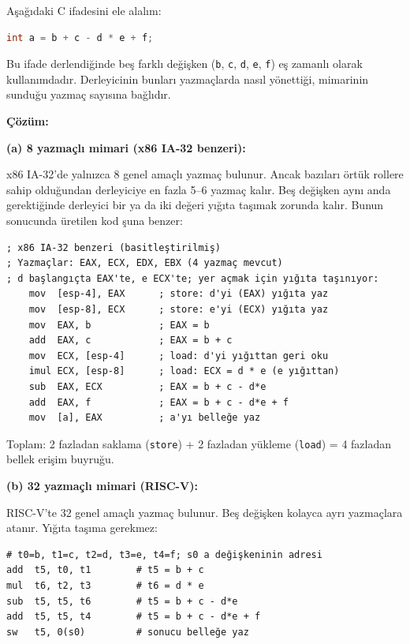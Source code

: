 \begin{ornek}[3.3]
\label{orn:yazmac-tasima}
Aşağıdaki C ifadesini ele alalım:

\begin{lstlisting}[language=C]
int a = b + c - d * e + f;
\end{lstlisting}

Bu ifade derlendiğinde beş farklı değişken (\texttt{b}, \texttt{c}, \texttt{d}, \texttt{e}, \texttt{f}) eş zamanlı olarak kullanımdadır. Derleyicinin bunları yazmaçlarda nasıl yönettiği, mimarinin sunduğu yazmaç sayısına bağlıdır.

\textbf{Çözüm:}

\textbf{(a) 8 yazmaçlı mimari (x86 IA-32 benzeri):}

x86 IA-32'de yalnızca 8 genel amaçlı yazmaç bulunur. Ancak bazıları örtük rollere sahip olduğundan derleyiciye en fazla 5--6 yazmaç kalır. Beş değişken aynı anda gerektiğinde derleyici bir ya da iki değeri yığıta taşımak zorunda kalır. Bunun sonucunda üretilen kod şuna benzer:

\begin{lstlisting}[language={}, morecomment={[l]{;}}, texcl=true]
; x86 IA-32 benzeri (basitleştirilmiş)
; Yazmaçlar: EAX, ECX, EDX, EBX (4 yazmaç mevcut)
; d başlangıçta EAX'te, e ECX'te; yer açmak için yığıta taşınıyor:
    mov  [esp-4], EAX      ; store: d'yi (EAX) yığıta yaz
    mov  [esp-8], ECX      ; store: e'yi (ECX) yığıta yaz
    mov  EAX, b            ; EAX = b
    add  EAX, c            ; EAX = b + c
    mov  ECX, [esp-4]      ; load: d'yi yığıttan geri oku
    imul ECX, [esp-8]      ; load: ECX = d * e (e yığıttan)
    sub  EAX, ECX          ; EAX = b + c - d*e
    add  EAX, f            ; EAX = b + c - d*e + f
    mov  [a], EAX          ; a'yı belleğe yaz
\end{lstlisting}

Toplam: 2 fazladan saklama (\texttt{store}) + 2 fazladan yükleme (\texttt{load}) = 4 fazladan bellek erişim buyruğu.

\textbf{(b) 32 yazmaçlı mimari (RISC-V):}

RISC-V'te 32 genel amaçlı yazmaç bulunur. Beş değişken kolayca ayrı yazmaçlara atanır. Yığıta taşıma gerekmez:

\begin{lstlisting}[style=riscv]
# t0=b, t1=c, t2=d, t3=e, t4=f; s0 a değişkeninin adresi
add  t5, t0, t1        # t5 = b + c
mul  t6, t2, t3        # t6 = d * e
sub  t5, t5, t6        # t5 = b + c - d*e
add  t5, t5, t4        # t5 = b + c - d*e + f
sw   t5, 0(s0)         # sonucu belleğe yaz
\end{lstlisting}


\end{ornek}
